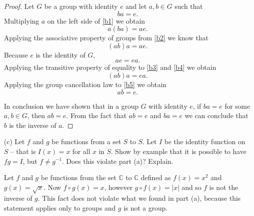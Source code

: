 \documentclass[11pt,a4paper]{article}
\begin{document}
\begin{proof}
Let $G$ be a group with identity $e$ and let $a,b \in G$ such that
\begin{equation}\label{b1}
ba = e.
\end{equation}
Multiplying $a$ on the left side of \eqref{b1} we obtain
\begin{equation}\label{b2}
a(ba) = ae.
\end{equation}
Applying the associative property of groups from \eqref{b2} we know that
\begin{equation}\label{b3}
(ab)a = ae.
\end{equation}
Because $e$ is the identity of $G$,
\begin{equation}\label{b4}
ae = ea.
\end{equation}
Applying the transitive property of equality to \eqref{b3} and \eqref{b4} we obtain
\begin{equation}\label{b5}
(ab)a = ea.
\end{equation}
Applying the group cancellation law to \eqref{b5} we obtain
\begin{equation}
ab = e.
\end{equation}

In conclusion we have shown that in a group $G$ with identity $e$, if $ba = e$ for some $a, b \in G$, then $ab = e$. From the fact that $ab = e$ and $ba = e$ we can conclude that $b$ is the inverse of $a$.
\end{proof}

(c) Let $f$ and $g$ be functions from a set $S$ to $S$. Let $I$ be the identity function
on $S$ -- that is $I(x) = x$ for all $x$ in $S$. Show by example that it is possible
to have $fg = I$, but $f \neq g^{-1}$. Does this violate part (a)? Explain.

Let $f$ and $g$ be functions from the set $\mathbb{C}$ to $\mathbb{C}$ defined as $f(x)=x^2$ and $g(x)=\sqrt{x}$. Now $f\circ g (x) = x$, however $g\circ f (x) = |x|$ and so $f$ is not the inverse of $g$. This fact does not violate what we found in part (a), because this statement applies only to groups and $g$ is not a group.
\end{document}
